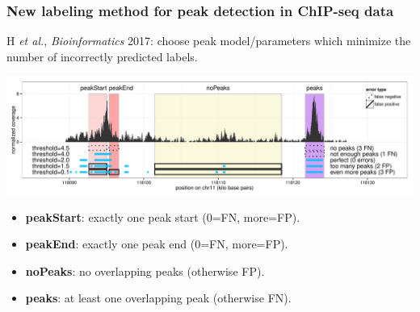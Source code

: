 \documentclass{beamer}
\begin{document}


\begin{frame}
  \frametitle{New labeling method for peak detection in ChIP-seq data}

  H {\it et al.}, {\it Bioinformatics} 2017: choose peak model/parameters
  which minimize the number of incorrectly predicted labels.

  \includegraphics[width=\textwidth]{figure-PeakError.pdf}
  \begin{itemize}
  \item \textbf{peakStart}: exactly one peak start (0=FN, more=FP).
  \item \textbf{peakEnd}: exactly one peak end (0=FN, more=FP).
  \item \textbf{noPeaks}: no overlapping peaks (otherwise FP).
  \item \textbf{peaks}: at least one overlapping peak (otherwise FN).
  \end{itemize}
\end{frame}
\end{document}
